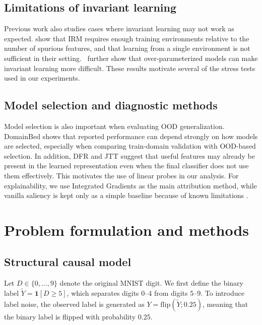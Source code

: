 \documentclass[12pt,a4paper]{article}
\begin{document}
\subsection{Limitations of invariant learning}
Previous work also studies cases where invariant learning may not work as expected. 
\citet{rosenfeld2021risks} show that IRM requires enough training environments 
relative to the number of spurious features, and that learning from a single 
environment is not sufficient in their setting.\ \citet{zhou2022sparseirm} further
show that over-parameterized models can make invariant learning more difficult. 
These results motivate several of the stress tests used in our experiments.

\subsection{Model selection and diagnostic methods}
Model selection is also important when evaluating OOD generalization. 
DomainBed \citep{domainbed2021} shows that reported performance can depend 
strongly on how models are selected, especially when comparing train-domain 
validation with OOD-based selection. In addition, DFR \citep{kirichenko2022dfr} 
and JTT \citep{liu2021jtt} suggest that useful features may already be 
present in the learned representation even when the final classifier 
does not use them effectively. This motivates the use of linear probes 
in our analysis. For explainability, we use Integrated Gradients 
\citep{sundararajan2017ig} as the main attribution method, while vanilla 
saliency is kept only as a simple baseline because of known 
limitations \citep{adebayo2018sanity}.
\clearpage
\section[Problem formulation and methods]{Problem formulation and methods}
\label{sec:problem}

\subsection{Structural causal model}
Let $D \in \{0,\dots,9\}$ denote the original MNIST digit. We first define the binary
label $\tilde{Y} = \mathbf{1}[D \ge 5]$, which separates digits $0$--$4$ from digits
$5$--$9$. To introduce label noise, the observed label is generated as
$Y = \mathrm{flip}(\tilde{Y};0.25)$, meaning that the binary label is flipped with
probability $0.25$.
\end{document}
